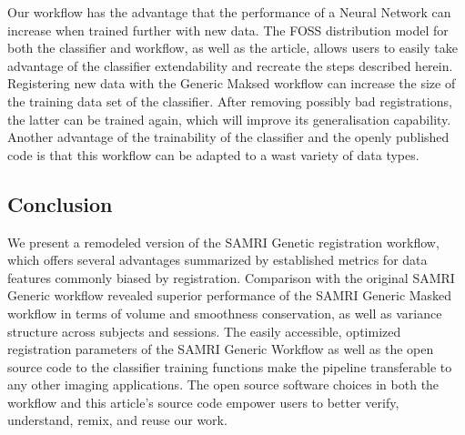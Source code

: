 Our workflow has the advantage that the performance of a Neural Network can increase when trained further with new data.
The FOSS distribution model for both the classifier and workflow, as well as the article, allows users to easily take advantage of the classifier extendability and recreate the steps described herein.
Registering new data with the Generic Maksed workflow can increase the size of the training data set of the classifier.
After removing possibly bad registrations, the latter can be trained again, which will improve its generalisation capability.
Another advantage of the trainability of the classifier and the openly published code is that this workflow can be adapted to a wast variety of data types.

\subsection{Conclusion}

We present a remodeled version of the SAMRI Genetic registration workflow, which offers several advantages summarized by established metrics for data features commonly biased by registration.
Comparison with the original SAMRI Generic workflow revealed superior performance of the SAMRI Generic Masked workflow in terms of volume and smoothness conservation, as well as variance structure across subjects and sessions.
The easily accessible, optimized registration parameters of the SAMRI Generic Workflow as well as the open source code to the classifier training functions make the pipeline transferable to any other imaging applications.
The open source software choices in both the workflow and this article's source code empower users to better verify, understand, remix, and reuse our work.
